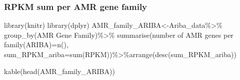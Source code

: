 \documentclass[
]{article}
\newenvironment{Shaded}{\begin{snugshade}}{\end{snugshade}}
\newcommand{\AttributeTok}[1]{\textcolor[rgb]{0.77,0.63,0.00}{#1}}
\newcommand{\ConstantTok}[1]{\textcolor[rgb]{0.00,0.00,0.00}{#1}}
\newcommand{\FunctionTok}[1]{\textcolor[rgb]{0.00,0.00,0.00}{#1}}
\newcommand{\NormalTok}[1]{#1}
\newcommand{\OtherTok}[1]{\textcolor[rgb]{0.56,0.35,0.01}{#1}}
\newcommand{\SpecialCharTok}[1]{\textcolor[rgb]{0.00,0.00,0.00}{#1}}
\newcommand{\StringTok}[1]{\textcolor[rgb]{0.31,0.60,0.02}{#1}}
\begin{document}
\begin{Shaded}
\end{Shaded}

\hypertarget{rpkm-sum-per-amr-gene-family-1}{%
\subsubsection{RPKM sum per AMR gene
family}\label{rpkm-sum-per-amr-gene-family-1}}

\begin{Shaded}
\begin{Highlighting}[]
\FunctionTok{library}\NormalTok{(knitr)}
\FunctionTok{library}\NormalTok{(dplyr)}
\NormalTok{AMR\_family\_ARIBA}\OtherTok{\textless{}{-}}\NormalTok{Ariba\_data}\SpecialCharTok{\%\textgreater{}\%}
  \FunctionTok{group\_by}\NormalTok{(}\StringTok{\textasciigrave{}}\AttributeTok{AMR Gene Family}\StringTok{\textasciigrave{}}\NormalTok{)}\SpecialCharTok{\%\textgreater{}\%}
  \FunctionTok{summarise}\NormalTok{(}\StringTok{\textquotesingle{}number of AMR genes per family(ARIBA)\textquotesingle{}}\OtherTok{=}\FunctionTok{n}\NormalTok{(),}
            \StringTok{\textquotesingle{}sum\_RPKM\_ariba\textquotesingle{}}\OtherTok{=}\FunctionTok{sum}\NormalTok{(RPKM))}\SpecialCharTok{\%\textgreater{}\%}\FunctionTok{arrange}\NormalTok{(}\FunctionTok{desc}\NormalTok{(}\StringTok{\textquotesingle{}sum\_RPKM\_ariba\textquotesingle{}}\NormalTok{))}

\FunctionTok{kable}\NormalTok{(}\FunctionTok{head}\NormalTok{(AMR\_family\_ARIBA))}
\end{Highlighting}
\end{Shaded}
\end{document}
